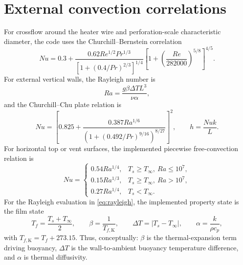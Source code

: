 \documentclass[11pt]{article}
\begin{document}
\section{External convection correlations}
For crossflow around the heater wire and perforation-scale characteristic diameter, the code uses the Churchill--Bernstein correlation
\begin{equation}
\label{eq:churchill_bernstein}
Nu=
0.3+
\frac{0.62Re^{1/2}Pr^{1/3}}
{\left[1+(0.4/Pr)^{2/3}\right]^{1/4}}
\left[1+\left(\frac{Re}{282000}\right)^{5/8}\right]^{4/5}.
\end{equation}
For external vertical walls, the Rayleigh number is
\begin{equation}
\label{eq:rayleigh}
Ra=\frac{g\beta\Delta T L^3}{\nu\alpha},
\end{equation}
and the Churchill--Chu plate relation is
\begin{equation}
\label{eq:natural_convection_vertical}
Nu=\left[
0.825+
\frac{0.387Ra^{1/6}}
{\left(1+(0.492/Pr)^{9/16}\right)^{8/27}}
\right]^2,
\qquad
h=\frac{Nu k}{L}.
\end{equation}
For horizontal top or vent surfaces, the implemented piecewise free-convection relation is
\begin{equation}
\label{eq:natural_convection_horizontal}
Nu=
\begin{cases}
0.54Ra^{1/4}, & T_s\ge T_\infty,\ Ra\le 10^7,\\
0.15Ra^{1/3}, & T_s\ge T_\infty,\ Ra>10^7,\\
0.27Ra^{1/4}, & T_s<T_\infty.
\end{cases}
\end{equation}
For the Rayleigh evaluation in \eqref{eq:rayleigh}, the implemented property state is the film state
\begin{equation}
\label{eq:rayleigh_film_definitions}
T_f=\frac{T_s+T_\infty}{2},\qquad
\beta=\frac{1}{T_{f,\mathrm{K}}},\qquad
\Delta T=\left|T_s-T_\infty\right|,\qquad
\alpha=\frac{k}{\rho c_p},
\end{equation}
with \(T_{f,\mathrm{K}}=T_f+273.15\). Thus, conceptually: \(\beta\) is the thermal-expansion term driving buoyancy, \(\Delta T\) is the wall-to-ambient buoyancy temperature difference, and \(\alpha\) is thermal diffusivity.
\end{document}
